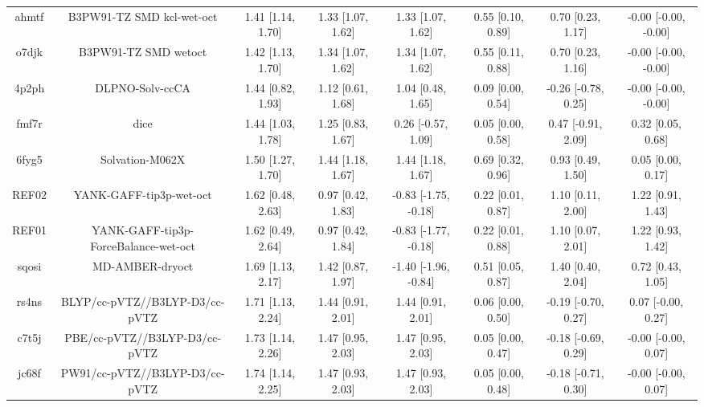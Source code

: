 \documentclass{article}
\begin{document}
\begin{center}
\begin{longtable}{|cccccccc|}
 ahmtf &                          B3PW91-TZ SMD kcl-wet-oct &  1.41 [1.14, 1.70] &  1.33 [1.07, 1.62] &     1.33 [1.07, 1.62] &  0.55 [0.10, 0.89] &    0.70 [0.23, 1.17] &  -0.00 [-0.00, -0.00] \\
 o7djk &                               B3PW91-TZ SMD wetoct &  1.42 [1.13, 1.70] &  1.34 [1.07, 1.62] &     1.34 [1.07, 1.62] &  0.55 [0.11, 0.88] &    0.70 [0.23, 1.16] &  -0.00 [-0.00, -0.00] \\
 4p2ph &                                    DLPNO-Solv-ccCA &  1.44 [0.82, 1.93] &  1.12 [0.61, 1.68] &     1.04 [0.48, 1.65] &  0.09 [0.00, 0.54] &  -0.26 [-0.78, 0.25] &  -0.00 [-0.00, -0.00] \\
 fmf7r &                                               dice &  1.44 [1.03, 1.78] &  1.25 [0.83, 1.67] &    0.26 [-0.57, 1.09] &  0.05 [0.00, 0.58] &   0.47 [-0.91, 2.09] &     0.32 [0.05, 0.68] \\
 6fyg5 &                                    Solvation-M062X &  1.50 [1.27, 1.70] &  1.44 [1.18, 1.67] &     1.44 [1.18, 1.67] &  0.69 [0.32, 0.96] &    0.93 [0.49, 1.50] &     0.05 [0.00, 0.17] \\
 REF02 &                            YANK-GAFF-tip3p-wet-oct &  1.62 [0.48, 2.63] &  0.97 [0.42, 1.83] &  -0.83 [-1.75, -0.18] &  0.22 [0.01, 0.87] &    1.10 [0.11, 2.00] &     1.22 [0.91, 1.43] \\
 REF01 &               YANK-GAFF-tip3p-ForceBalance-wet-oct &  1.62 [0.49, 2.64] &  0.97 [0.42, 1.84] &  -0.83 [-1.77, -0.18] &  0.22 [0.01, 0.88] &    1.10 [0.07, 2.01] &     1.22 [0.93, 1.42] \\
 sqosi &                                    MD-AMBER-dryoct &  1.69 [1.13, 2.17] &  1.42 [0.87, 1.97] &  -1.40 [-1.96, -0.84] &  0.51 [0.05, 0.87] &    1.40 [0.40, 2.04] &     0.72 [0.43, 1.05] \\
 rs4ns &                     BLYP/cc-pVTZ//B3LYP-D3/cc-pVTZ &  1.71 [1.13, 2.24] &  1.44 [0.91, 2.01] &     1.44 [0.91, 2.01] &  0.06 [0.00, 0.50] &  -0.19 [-0.70, 0.27] &    0.07 [-0.00, 0.27] \\
 c7t5j &                      PBE/cc-pVTZ//B3LYP-D3/cc-pVTZ &  1.73 [1.14, 2.26] &  1.47 [0.95, 2.03] &     1.47 [0.95, 2.03] &  0.05 [0.00, 0.47] &  -0.18 [-0.69, 0.29] &   -0.00 [-0.00, 0.07] \\
 jc68f &                     PW91/cc-pVTZ//B3LYP-D3/cc-pVTZ &  1.74 [1.14, 2.25] &  1.47 [0.93, 2.03] &     1.47 [0.93, 2.03] &  0.05 [0.00, 0.48] &  -0.18 [-0.71, 0.30] &   -0.00 [-0.00, 0.07] \\

\end{longtable}
\end{center}
\end{document}
